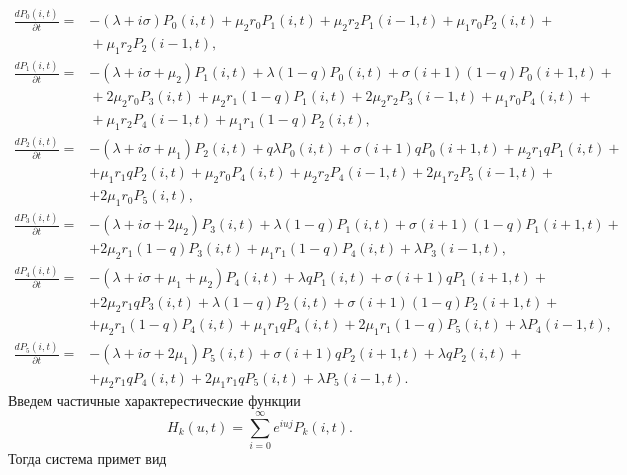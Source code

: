 \begin{align*} 
	\frac{dP_{0}(i,t)}{\partial t}=&-(\lambda+i\sigma)P_{0}(i,t)+\mu_{2}r_{0}P_{1}(i,t)+\mu_{2}r_{2}P_{1}(i-1,t)+\mu_{1}r_{0}P_{2}(i,t)+\\
	&{}+\mu_{1}r_{2}P_{2}(i-1,t),\\
	\frac{dP_{1}(i,t)}{\partial t}=&-(\lambda+i\sigma+\mu_{2})P_{1}(i,t)+\lambda(1-q)P_{0}(i,t)+\sigma(i+1)(1-q)P_{0}(i+1,t)+\\
	&{}+2\mu_{2}r_{0}P_{3}(i,t) + \mu_{2}r_{1}(1-q)P_{1}(i,t)+2\mu_{2}r_{2}P_{3}(i-1,t)+\mu_{1}r_{0}P_{4}(i,t)+\\
	&{}+\mu_{1}r_{2}P_{4}(i-1,t)+\mu_{1}r_{1}(1-q)P_{2}(i,t),\\
	\frac{dP_{2}(i,t)}{\partial t}=&-(\lambda+i\sigma+\mu_{1})P_{2}(i,t)+q\lambda P_{0}(i,t)+\sigma(i+1)qP_{0}(i+1,t)+\mu_{2}r_{1}qP_{1}(i,t)+\\
	&+\mu_{1}r_{1}qP_{2}(i,t)+\mu_{2}r_{0}P_{4}(i,t)+\mu_{2}r_{2}P_{4}(i-1,t)+2\mu_{1}r_{2}P_{5}(i-1,t)+\\
	&+2\mu_{1}r_{0}P_{5}(i,t),\\
	\frac{dP_{3}(i,t)}{\partial t}=&-(\lambda+i\sigma+2\mu_{2})P_{3}(i,t)+\lambda(1-q)P_{1}(i,t)+\sigma(i+1)(1-q)P_{1}(i+1,t)+\\
	&+2\mu_{2}r_{1}(1-q)P_{3}(i,t)+\mu_{1}r_{1}(1-q)P_{4}(i,t)+\lambda P_{3}(i-1,t),\\
	\frac{dP_{4}(i,t)}{\partial t}=&-(\lambda+i\sigma+\mu_{1}+\mu_{2})P_{4}(i,t)+\lambda qP_{1}(i,t)+\sigma(i+1)qP_{1}(i+1,t)+\\
	&+2\mu_{2}r_{1}qP_{3}(i,t)+\lambda(1-q)P_{2}(i,t)+\sigma(i+1)(1-q)P_{2}(i+1,t)+\\
	&+\mu_{2}r_{1}(1-q)P_{4}(i,t)+\mu_{1}r_{1}qP_{4}(i,t)+2\mu_{1}r_{1}(1-q)P_{5}(i,t)+\lambda P_{4}(i-1,t),\\
	\frac{dP_{5}(i,t)}{\partial t}=&-(\lambda+i\sigma+2\mu_{1})P_{5}(i,t)+\sigma(i+1)qP_{2}(i+1,t)+\lambda qP_{2}(i,t)+\\
	&+\mu_{2}r_{1}qP_{4}(i,t)+2\mu_{1}r_{1}qP_{5}(i,t)+\lambda P_{5}(i-1,t).
\end{align*} 
Введем частичные характерестические функции
$$H_{k}(u,t)=\sum_{i=0}^\infty e^{iuj}P_{k}(i,t).$$
Тогда система примет вид
